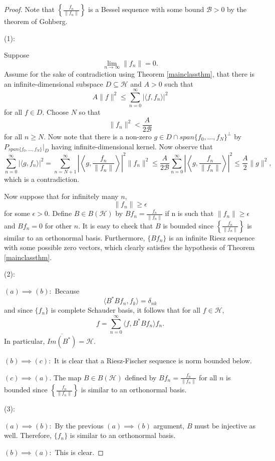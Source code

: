 \documentclass[11pt]{amsart}
\theoremstyle{definition}
\numberwithin{equation}{section}
\newcommand{\Hcal}{\mathcal{H}} %
\begin{document}
\begin{proof}
Note that $\left\{\frac{f_n}{\|f_n\|} \right\}$ is a Bessel sequence with some bound $\mathcal{B}>0$ by the theorem of Gohberg.

(1):

Suppose $$\lim_{n\to \infty}\|f_n\|=0.$$ Assume for the sake of contradiction using Theorem \ref{mainclassthm}, that there is an infinite-dimensional subspace $D\subseteq \Hcal$ and $A>0$ such that
$$A\|f\|^{2}\leq \sum_{n=0}^{\infty}|\langle f, f_n\rangle|^{2}$$ for all $f\in D.$ Choose $N$ so that $$\|f_{n}\|^{2}<\frac{A}{2\mathcal{B}}$$ for all $n\geq N$.
Now note that there is a non-zero $g\in D\cap span\{f_{0},\dots, f_{N}\}^{\perp}$ by $P_{span\{f_{0},\dots ,f_{N}\}}|_{D}$ having infinite-dimensional kernel.
Now observe that
$$\sum_{n=0}^{\infty}|\langle g,f_n\rangle|^{2}=\sum_{n=N+1}^{\infty}\left|\left\langle g,\frac{f_n}{\|f_n\|} \right\rangle \right|^{2}\|f_n\|^{2}\leq \frac{A}{2\mathcal{B}} \sum_{n=0}^{\infty}\left|\left\langle g,\frac{f_n}{\|f_n\|} \right\rangle \right|^{2}\leq \frac{A}{2} \|g\|^{2},$$ which is a contradiction.

Now suppose that for infinitely many $n$, $$\|f_n\|\geq \epsilon$$ for some $\epsilon>0$. Define $B\in B(\Hcal)$ by $Bf_n=\frac{f_n}{\|f_n\|}$ if n is such that $\|f_n\|\geq \epsilon$ and $Bf_n=0$ for other $n$. It is easy to check that $B$ is bounded since $\left\{\frac{f_n}{\|f_n\|} \right\}$ is similar to an orthonormal basis. Furthermore, $\{Bf_n\}$ is an infinite Riesz sequence with some possible zero vectors, which clearly satisfies the hypothesis of Theorem \ref{mainclassthm}.

(2):

$(a)\implies (b):$ Because $$\langle B^{*}Bf_n,f_k\rangle=\delta_{nk}$$ and since $\{f_n\}$ is complete Schauder basis, it follows that for all $f\in  \Hcal$,
$$f=\sum_{n=0}^{\infty}\langle f, B^{*}Bf_n\rangle f_n.$$ In particular, $\overline{Im(B^{*})}=\Hcal$.

$(b)\implies (c):$ It is clear that a Riesz-Fischer sequence is norm bounded below.

$(c)\implies (a)$.
The map $B\in B(\Hcal)$ defined by $Bf_n=\frac{f_n}{\|f_n\|}$ for all $n$ is bounded since $\left\{\frac{f_n}{\|f_n\|} \right\}$ is similar to an orthonormal basis. 

(3):

$(a)\implies (b):$ By the previous $(a)\implies (b)$ argument, $B$ must be injective as well. Therefore, $\{f_n\}$ is similar to an orthonormal basis.

$(b)\implies (a):$ This is clear. 

\end{proof}
\end{document}
